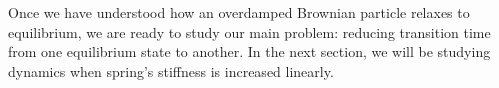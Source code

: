 \documentclass[11pt,a4paper]{article}
\begin{document}
Once we have understood how an overdamped Brownian particle relaxes to equilibrium, we are ready to study our main problem: reducing transition time from one equilibrium state to another. In the next section, we will be studying dynamics when spring's stiffness is increased linearly.


%
%
%
%
%
%
\end{document}
